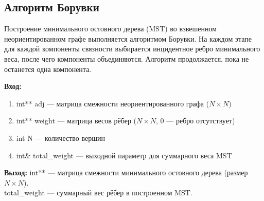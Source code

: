 \subsection{Алгоритм Борувки}
Построение минимального остовного дерева (MST) во взвешенном неориентированном графе выполняется алгоритмом Борувки. На каждом этапе для каждой компоненты связности выбирается инцидентное ребро минимального веса, после чего компоненты объединяются. Алгоритм продолжается, пока не останется одна компонента.

\noindent\textbf{Вход:}
\begin{enumerate}
	\item int** adj — матрица смежности неориентированного графа ($N \times N$)
	\item int** weight — матрица весов рёбер ($N \times N$, 0 — ребро отсутствует)
	\item int N — количество вершин
	\item int\& total\_weight — выходной параметр для суммарного веса MST
\end{enumerate}
\noindent\textbf{Выход:}
int** — матрица смежности минимального остовного дерева (размер $N \times N$). \\
total\_weight — суммарный вес рёбер в построенном MST.

